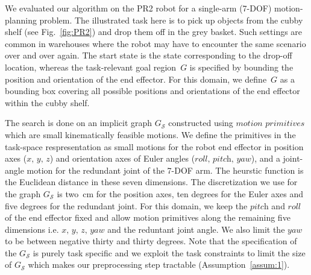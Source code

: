 \documentclass[letterpaper]{article} %
\newcommand{\calS}{\ensuremath{\mathcal{S}}\xspace}
\begin{document}
We evaluated our algorithm on the PR2 robot for a single-arm (7-DOF) motion-planning problem. The illustrated task here is to pick up objects from the cubby shelf (see Fig.~\ref{fig:PR2}) and drop them off in the grey basket. Such settings are common in warehouses where the robot may have to encounter the same scenario over and over again. The start state is the state corresponding to the drop-off location, whereas the task-relevant goal region~$G$ is specified by bounding the position and orientation of the end effector. For this domain, we define~$G$ as a bounding box covering all possible positions and orientations of the end effector within the cubby shelf.

The search is done on an implicit graph $G_\calS$ constructed using $\textit{motion primitives}$ which are small kinematically feasible motions. We define the primitives in the task-space respresentation as small motions for the robot end effector in position axes ($\textit{x, y, z}$) and orientation axes of Euler angles ($\textit{roll, pitch, yaw}$), and a joint-angle motion for the redundant joint of the 7-DOF arm. 
The heurstic function is the Euclidean distance in these seven dimensions. The discretization we use for the graph $G_\calS$ is two~cm for the position axes, ten degrees for the Euler axes and five degrees for the redundant joint. 
For this domain, we keep the $\textit{pitch}$ and $\textit{roll}$ of the end effector fixed and allow motion primitives along the remaining five dimensions i.e. $\textit{x, y, z, yaw}$ and the reduntant joint angle. We also limit the $\textit{yaw}$ to be between negative thirty and thirty degrees. Note that the specification of the $G_\calS$ is purely task specific and we exploit the task constraints to limit the size of $G_\calS$ which makes our preprocessing step tractable (Assumption~\ref{assum:1}).
\end{document}
